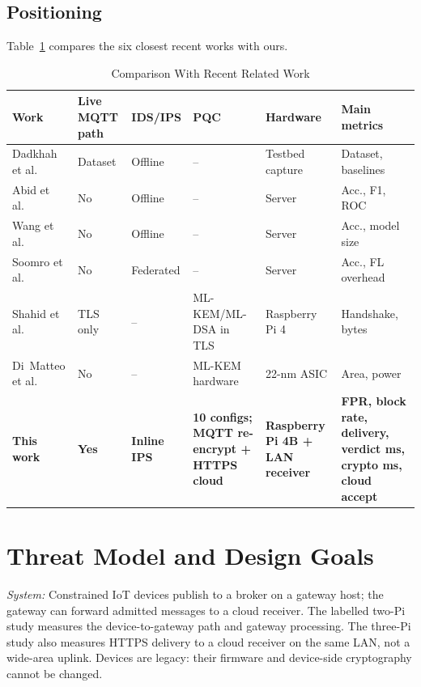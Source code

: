 \documentclass[journal]{IEEEtran}
\begin{document}
\subsection{Positioning}

Table~\ref{tab:related} compares the six closest recent works with ours.

\begin{table}[!t]
\centering
\caption{Comparison With Recent Related Work}
\label{tab:related}
\footnotesize
\begin{tabular}{p{2.8cm}p{2.0cm}p{1.6cm}p{2.8cm}p{2.2cm}p{4.0cm}}
\toprule
\textbf{Work} & \textbf{Live MQTT path} & \textbf{IDS/IPS} & \textbf{PQC} & \textbf{Hardware} & \textbf{Main metrics} \\
\midrule
Dadkhah et al.~\cite{ciciomt2024} & Dataset & Offline & -- & Testbed capture & Dataset, baselines \\
Abid et al.~\cite{abid2025gwo} & No & Offline & -- & Server & Acc., F1, ROC \\
Wang et al.~\cite{wang2025skd} & No & Offline & -- & Server & Acc., model size \\
Soomro et al.~\cite{soomro2025roche} & No & Federated & -- & Server & Acc., FL overhead \\
Shahid et al.~\cite{shahid2026pqtls} & TLS only & -- & ML-KEM/ML-DSA in TLS & Raspberry Pi 4 & Handshake, bytes \\
Di~Matteo et al.~\cite{dimatteo2026kem22} & No & -- & ML-KEM hardware & 22-nm ASIC & Area, power \\
\midrule
\textbf{This work} & \textbf{Yes} & \textbf{Inline IPS} & \textbf{10 configs; MQTT re-encrypt + HTTPS cloud} & \textbf{Raspberry Pi 4B + LAN receiver} & \textbf{FPR, block rate, delivery, verdict ms, crypto ms, cloud accept} \\
\bottomrule
\end{tabular}
\end{table}

\section{Threat Model and Design Goals}
\label{sec:threat}

\textit{System:} Constrained IoT devices publish to a broker on a gateway host; the gateway can forward admitted messages to a cloud receiver. The labelled two-Pi study measures the device-to-gateway path and gateway processing. The three-Pi study also measures HTTPS delivery to a cloud receiver on the same LAN, not a wide-area uplink. Devices are legacy: their firmware and device-side cryptography cannot be changed.
\end{document}
